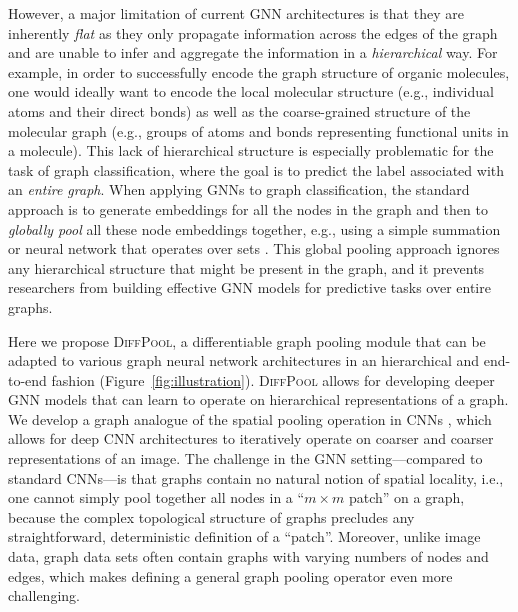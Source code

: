\documentclass{article}
\newcommand{\name}{\textsc{DiffPool}\xspace}
\begin{document}
However, a major limitation of current GNN architectures is that they are inherently {\em flat} as they only propagate information across the edges of the graph and are unable to infer and aggregate the information in a \textit{hierarchical} way. 
For example, in order to successfully encode the graph structure of organic molecules, one would ideally want to encode the local molecular structure (e.g., individual atoms and their direct bonds) as well as the coarse-grained structure of the molecular graph (e.g., groups of atoms and bonds representing functional units in a molecule).
This lack of hierarchical structure is especially problematic for the task of graph classification, where the goal is to predict the label associated with an \textit{entire graph}. When applying GNNs to graph classification, the standard approach is to generate embeddings for all the nodes in the graph and then to {\em globally pool} all these node embeddings together, e.g., using a simple summation or neural network that operates over sets \cite{dai2016discriminative,Duv+2015,Gil+2017,Li+2016}. This global pooling approach ignores any hierarchical structure that might be present in the graph, and it prevents researchers from building effective GNN models for predictive tasks over entire graphs.







Here we propose \name, a differentiable graph pooling module that can be adapted to various graph neural network architectures in an hierarchical and end-to-end fashion (Figure~\ref{fig:illustration}). 
\name allows for developing deeper GNN models that can learn to operate on hierarchical representations of a graph. We develop a graph analogue of the spatial pooling operation in CNNs \cite{krizhevsky2012imagenet}, which allows for deep CNN architectures to iteratively operate on coarser and coarser representations of an image. The challenge in the GNN setting---compared to standard CNNs---is that graphs contain no natural notion of spatial locality, i.e., one cannot simply pool together all nodes in a ``$m \times m$ patch'' on a graph, because the complex topological structure of graphs precludes any straightforward, deterministic definition of a ``patch''. Moreover, unlike image data, graph data sets often contain graphs with varying numbers of nodes and edges, which makes defining a general graph pooling operator even more challenging.
\end{document}
